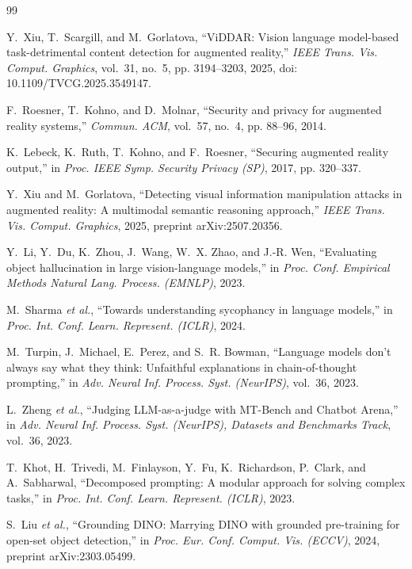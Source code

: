 \documentclass[conference]{IEEEtran}
\begin{document}
\begin{thebibliography}{99}

Y.~Xiu, T.~Scargill, and M.~Gorlatova, ``{ViDDAR}: Vision language model-based task-detrimental
content detection for augmented reality,'' \emph{IEEE Trans. Vis. Comput. Graphics}, vol.~31, no.~5,
pp. 3194--3203, 2025, doi: 10.1109/TVCG.2025.3549147.

F.~Roesner, T.~Kohno, and D.~Molnar, ``Security and privacy for augmented reality systems,''
\emph{Commun. ACM}, vol.~57, no.~4, pp. 88--96, 2014.

K.~Lebeck, K.~Ruth, T.~Kohno, and F.~Roesner, ``Securing augmented reality output,'' in \emph{Proc.
IEEE Symp. Security Privacy (SP)}, 2017, pp. 320--337.

Y.~Xiu and M.~Gorlatova, ``Detecting visual information manipulation attacks in augmented reality: A
multimodal semantic reasoning approach,'' \emph{IEEE Trans. Vis. Comput. Graphics}, 2025, preprint
arXiv:2507.20356.

Y.~Li, Y.~Du, K.~Zhou, J.~Wang, W.~X. Zhao, and J.-R. Wen, ``Evaluating object hallucination in large
vision-language models,'' in \emph{Proc. Conf. Empirical Methods Natural Lang. Process. (EMNLP)},
2023.

M.~Sharma \emph{et al.}, ``Towards understanding sycophancy in language models,'' in \emph{Proc. Int.
Conf. Learn. Represent. (ICLR)}, 2024.

M.~Turpin, J.~Michael, E.~Perez, and S.~R. Bowman, ``Language models don't always say what they think:
Unfaithful explanations in chain-of-thought prompting,'' in \emph{Adv. Neural Inf. Process. Syst.
(NeurIPS)}, vol.~36, 2023.

L.~Zheng \emph{et al.}, ``Judging {LLM}-as-a-judge with {MT-Bench} and {Chatbot Arena},'' in \emph{Adv.
Neural Inf. Process. Syst. (NeurIPS), Datasets and Benchmarks Track}, vol.~36, 2023.

T.~Khot, H.~Trivedi, M.~Finlayson, Y.~Fu, K.~Richardson, P.~Clark, and A.~Sabharwal, ``Decomposed
prompting: A modular approach for solving complex tasks,'' in \emph{Proc. Int. Conf. Learn. Represent.
(ICLR)}, 2023.

S.~Liu \emph{et al.}, ``Grounding {DINO}: Marrying {DINO} with grounded pre-training for open-set
object detection,'' in \emph{Proc. Eur. Conf. Comput. Vis. (ECCV)}, 2024, preprint arXiv:2303.05499.


\end{thebibliography}
\end{document}
